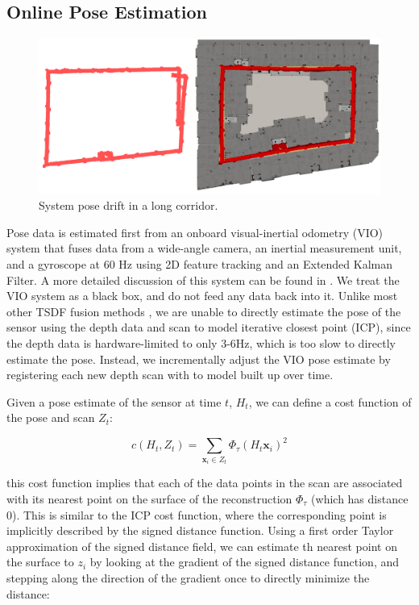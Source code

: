 \documentclass[conference]{IEEEtran}
\newcommand{\TSDF}{TSDF\xspace}
\begin{document}
\subsection{Online Pose Estimation}
\label{section:pose}
 \begin{figure}
	\centering
 	 \includegraphics[width=1\columnwidth]{img/corridor_composite.png}
 	 \caption{System pose drift in a long corridor.}
 	 \label{fig:drift}
\end{figure}
Pose data is estimated first from an onboard visual-inertial odometry
(VIO) system that fuses data from a wide-angle camera, an inertial measurement
unit, and a gyroscope at 60 Hz using 2D feature tracking and an Extended Kalman Filter. A more detailed
discussion of this system can be found in \cite{VINS, VINS2}. We treat the VIO
system as a black box, and do not feed any data back into it. Unlike most other
\TSDF fusion methods \cite{Newcombe, Whelan2013, Bylow2013, NiessnerHashing} ,
we are unable to directly estimate the pose of the sensor using the depth data
and scan to model iterative closest point (ICP)\cite{BeslICP}, since the depth
data is hardware-limited to only 3-6Hz, which is too slow to directly estimate the pose. Instead, we incrementally
adjust the VIO pose estimate by registering each new depth scan with to model
built up over time.

Given a pose estimate of the sensor at time $t$, $H_{t}$, we can define a cost
function of the pose and scan $Z_t$:

\begin{equation}
	c(H_{t}, Z_t) = \sum_{\mathbf{x}_i \in Z_{t}} \Phi_{\tau}(H_{t} \mathbf{x}_i)^2
\end{equation}

\noindent this cost function implies that each of the data points in the scan
are associated with its nearest point on the surface of the reconstruction
$\Phi_{\tau}$ (which has distance 0). This is similar to the ICP cost function, where the
corresponding point is implicitly described by the signed distance function.
Using a first order Taylor approximation of the signed distance field, we can
estimate th nearest point on the surface to $z_i$ by looking at
the gradient of the signed distance function, and stepping along the direction
of the  gradient once to directly minimize the distance:
\end{document}
